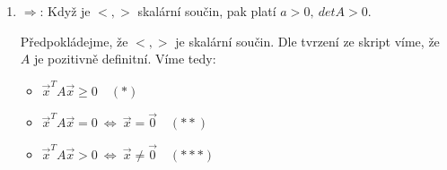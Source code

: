 \documentclass[12pt]{article}
\begin{document}
\begin{enumerate}
\begin{enumerate}
        \[
          \vec{x}^T A \vec{x} = \vec{x}^T \left( \begin{array}{cc}
            ax_1 & +bx_2 \\ bx_1 & +dx_2
          \end{array} \right) = ax_1^2 + bx_1x_2 + bx_2x_1 + dx_2^2 = ax_1^2 + 2bx_2x_1 + dx_2^2
        \]
        Zvolme libovolně $x_2\in\mathbb{R}^2$, zkoumejme parabolu podle $x_1$. Rozdělme případy:
        \begin{enumerate}
          \item $x_2 \neq 0$:
            \begin{align*}
              (a)x_1^2 + (2bx_2)x_1 + (dx_2^2) \\
              D = 4b^2x_2^2 - 4adx_2^2 = \underbrace{4x_2^2}_+\underbrace{(b^2-ad)}_{- \text{ dle }(*)} < 0
            \end{align*}
            Z diskriminantu plyne, že neexistuje $x_1$ takové, že součin bude roven nule. 
            A protože platí $a>0$, parabola se nachází celá nad 0. Tedy $\vec{x}^T A \vec{x} > 0$
          \item $x_2 = 0$:
            \[
              (a)x_1^2 + (2bx_2)x_1 + (dx_2^2) = (a)x_1^2 +0+0 = (a)x_1^2
            \]
            Jelikož $a>0$, tato parabola je nezáporná a je rovna nule právě tehdy, když $x_1=0$.
            Čili $\vec{x}^T A \vec{x} \geq 0$, přičemž $\vec{x}^T A \vec{x} = \vec{0} \ \Leftrightarrow \ x_1=0$.
        \end{enumerate}

        Každopádně dostáváme $\vec{x}^T A \vec{x} \geq 0$.
      
      \item Z úvah b.i, b.ii plyne:
        \[\vec{x}^T A \vec{x} = 0 \quad \Longleftrightarrow \quad \vec{x} = \vec{0}\]
    \end{enumerate}

    Tedy matice A je pozitivně definitní, a tedy $<,>$ je skalární součin. $\quad \quad \square$

  \pagebreak
  
  \item $\Rightarrow$: Když je $<,>$ skalární součin, pak platí $a>0,\ detA>0$.
    \medskip
    
    Předpokládejme, že $<,>$ je skalární součin. Dle tvrzení ze skript víme, že $A$ je pozitivně definitní.
    Víme tedy:

    \begin{itemize}
      \item $\vec{x}^T A \vec{x} \geq 0 \quad (*)$
      \item $\vec{x}^T A \vec{x} = 0 \ \Leftrightarrow \ \vec{x}=\vec{0} \quad (**)$
      \item $\vec{x}^T A \vec{x} > 0 \ \Leftrightarrow \ \vec{x} \neq \vec{0} \quad (***)$
    \end{itemize}


\end{enumerate}
\end{document}
